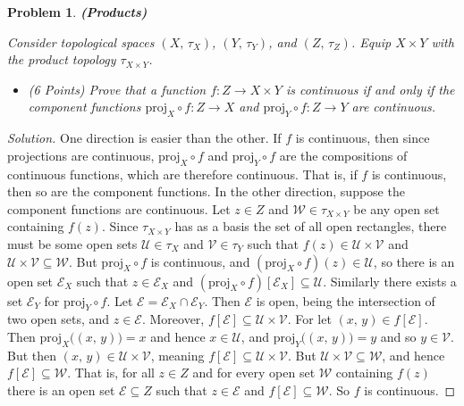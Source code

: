 \documentclass{article}
\theoremstyle{normal}
\newtheorem{problem}{Problem}
\begin{document}
    \newpage
    \color{blue}
    \begin{problem}
        \textbf{(Products)}
        \par\hfill\par
        Consider topological spaces $(X,\,\tau_{X})$, $(Y,\,\tau_{Y})$, and
        $(Z,\,\tau_{Z})$. Equip $X\times{Y}$ with the product topology
        $\tau_{X\times{Y}}$.
        \begin{itemize}
            \item (6 Points) Prove that a function
                $f:Z\rightarrow{X}\times{Y}$ is continuous if and only if the
                component functions $\textrm{proj}_{X}\circ{f}:Z\rightarrow{X}$
                and $\textrm{proj}_{Y}\circ{f}:Z\rightarrow{Y}$ are continuous.
        \end{itemize}
    \end{problem}
    \color{black}
    \begin{proof}[Solution]
        One direction is easier than the other. If $f$ is continuous, then
        since projections are continuous, $\textrm{proj}_{X}\circ{f}$ and
        $\textrm{proj}_{Y}\circ{f}$ are the compositions of continuous
        functions, which are therefore continuous. That is, if $f$ is continuous,
        then so are the component functions. In the other direction, suppose
        the component functions are continuous. Let $z\in{Z}$ and
        $\mathcal{W}\in\tau_{X\times{Y}}$ be any open set containing
        $f(z)$. Since $\tau_{X\times{Y}}$ has as a basis the set of all open
        rectangles, there must be some open sets $\mathcal{U}\in\tau_{X}$ and
        $\mathcal{V}\in\tau_{Y}$ such that $f(z)\in\mathcal{U}\times\mathcal{V}$
        and $\mathcal{U}\times\mathcal{V}\subseteq\mathcal{W}$. But
        $\textrm{proj}_{X}\circ{f}$ is continuous, and
        $(\textrm{proj}_{X}\circ{f})(z)\in\mathcal{U}$, so there is an open set
        $\mathcal{E}_{X}$ such that $z\in\mathcal{E}_{X}$ and
        $(\textrm{proj}_{X}\circ{f})[\mathcal{E}_{X}]\subseteq\mathcal{U}$.
        Similarly there exists a set $\mathcal{E}_{Y}$ for
        $\textrm{proj}_{Y}\circ{f}$. Let
        $\mathcal{E}=\mathcal{E}_{X}\cap\mathcal{E}_{Y}$. Then $\mathcal{E}$
        is open, being the intersection of two open sets, and
        $z\in\mathcal{E}$. Moreover,
        $f[\mathcal{E}]\subseteq\mathcal{U}\times\mathcal{V}$. For let
        $(x,\,y)\in{f}[\mathcal{E}]$. Then
        $\textrm{proj}_{X}\big((x,\,y)\big)=x$ and hence $x\in\mathcal{U}$, and
        $\textrm{proj}_{Y}\big((x,\,y)\big)=y$ and so $y\in\mathcal{V}$. But
        then $(x,\,y)\in\mathcal{U}\times\mathcal{V}$, meaning
        $f[\mathcal{E}]\subseteq\mathcal{U}\times\mathcal{V}$. But
        $\mathcal{U}\times\mathcal{V}\subseteq\mathcal{W}$, and hence
        $f[\mathcal{E}]\subseteq\mathcal{W}$. That is, for all
        $z\in{Z}$ and for every open set $\mathcal{W}$ containing $f(z)$ there
        is an open set $\mathcal{E}\subseteq{Z}$ such that
        $z\in\mathcal{E}$ and $f[\mathcal{E}]\subseteq\mathcal{W}$. So $f$ is
        continuous.
    \end{proof}
\end{document}
